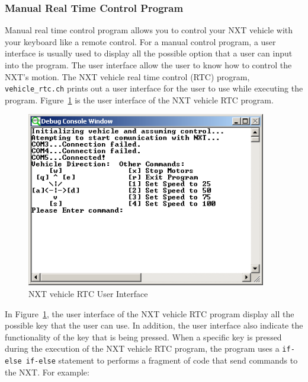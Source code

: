 \documentclass[11pt]{article}
\begin{document}
\subsubsection{Manual Real Time Control Program}
Manual real time control program allows you to control your NXT vehicle with 
your keyboard like a remote control. For a manual control program, a user interface 
is usually used to display all the possible option that a user can input into 
the program. The user interface allow the user to know how to control the NXT's 
motion. The NXT vehicle real time control (RTC) program, {\tt vehicle\_rtc.ch}
prints out a user interface for the user to use while executing the program. 
Figure~\ref{fig_NXT_GUI} is the user interface of the NXT vehicle RTC program.\\
\begin{figure}[h]
  \begin{center}
    \includegraphics[height=3in]{figure/mindstorm/RTC_GUI.png}
    \caption{NXT vehicle RTC User Interface \label{fig_NXT_GUI}}
  \end{center}
\end{figure}
In Figure~\ref{fig_NXT_GUI}, the user interface of the NXT vehicle RTC program 
display all the possible key that the user can use. In addition, the user 
interface also indicate the functionality of the key that is being pressed. When 
a specific key is pressed during the execution of the NXT vehicle RTC program, 
the program uses a \verb+if-else if-else+ statement to performs a fragment of 
code that send commands to the NXT. For example:\\
\end{document}
